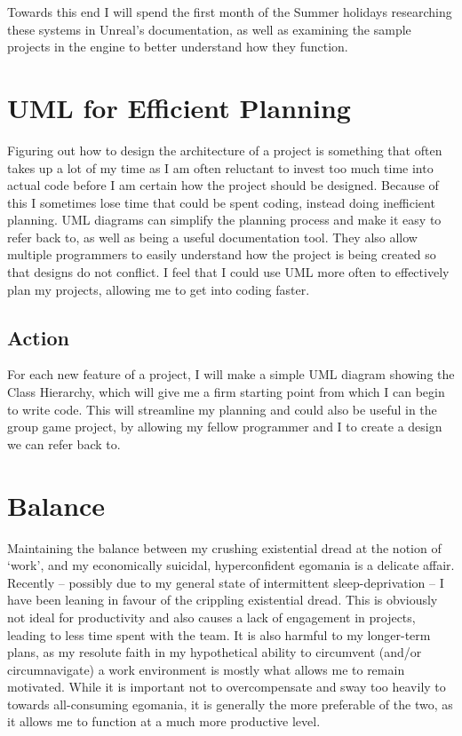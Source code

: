 \documentclass{scrartcl}
\begin{document}
Towards this end I will spend the first month of the Summer holidays researching these systems in Unreal’s documentation, as well as examining the sample projects in the engine to better understand how they function.


\section{UML for Efficient Planning}

Figuring out how to design the architecture of a project is something that often takes up a lot of my time as I am often reluctant to invest too much time into actual code before I am certain how the project should be designed. Because of this I sometimes lose time that could be spent coding, instead doing inefficient planning. UML diagrams can simplify the planning process and make it easy to refer back to, as well as being a useful documentation tool. They also allow multiple programmers to easily understand how the project is being created so that designs do not conflict. I feel that I could use UML more often to effectively plan my projects, allowing me to get into coding faster.


\subsection{Action} 

For each new feature of a project, I will make a simple UML diagram showing the Class Hierarchy, which will give me a firm starting point from which I can begin to write code. This will streamline my planning and could also be useful in the group game project, by allowing my fellow programmer and I to create a design we can refer back to. 


\section{Balance}

Maintaining the balance between my crushing existential dread at the notion of ‘work’, and my economically suicidal, hyperconfident egomania is a delicate affair. Recently – possibly due to my general state of intermittent sleep-deprivation – I have been leaning in favour of the crippling existential dread. This is obviously not ideal for productivity and also causes a lack of engagement in projects, leading to less time spent with the team. It is also harmful to my longer-term plans, as my resolute faith in my hypothetical ability to circumvent (and/or circumnavigate) a work environment is mostly what allows me to remain motivated. While it is important not to overcompensate and sway too heavily to towards all-consuming egomania, it is generally the more preferable of the two, as it allows me to function at a much more productive level.
\end{document}
